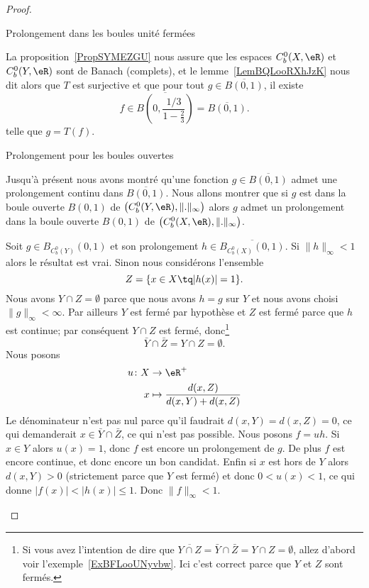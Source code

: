 \begin{proof}
\begin{subproof}
\item[Prolongement dans les boules unité fermées]

    La proposition~\ref{PropSYMEZGU} nous assure que les espaces \( C^0_b(X,\eR)\) et \( C_b^0(Y,\eR)\) sont de Banach (complets), et le lemme~\ref{LemBQLooRXhJzK} nous dit alors que \( T\) est surjective et que pour tout \( g\in\overline{ B(0,1) }\), il existe
    \begin{equation}
        f\in\overline{ B\left( 0,\frac{ 1/3 }{ 1-\frac{ 2 }{ 3 } } \right) }=\overline{ B(0,1) }.
    \end{equation}
    telle que \( g=T(f)\).


\item[Prolongement pour les boules ouvertes]

    Jusqu'à présent nous avons montré qu'une fonction \( g\in\overline{ B(0,1) }\) admet une prolongement continu dans \( \overline{ B(0,1) }\). Nous allons montrer que si \( g\) est dans la boule ouverte \( B(0,1)\) de \( \big( C^0_b(Y,\eR),\| . \|_{\infty} \big)\) alors \( g\) admet un prolongement dans la boule ouverte \( B(0,1)\) de \( \big( C_b^0(X,\eR),\| . \|_{\infty} \big)\).

    Soit \( g\in B_{C^0_b(Y)}(0,1) \) et son prolongement \( h\in \overline{ B_{C_b^0(X)}(0,1) }\). Si \( \| h \|_{\infty}<1\) alors le résultat est vrai. Sinon nous considérons l'ensemble
    \begin{equation}
        Z=\{ x\in X\tq | h(x) |=1 \}.
    \end{equation}
    Nous avons \( Y\cap Z=\emptyset\) parce que nous avons \( h=g\) sur \( Y\) et nous avons choisi \( \| g \|_{\infty}<\infty\). Par ailleurs \( Y\) est fermé par hypothèse et \( Z\) est fermé parce que \( h\) est continue; par conséquent \( Y\cap Z\) est fermé, donc\footnote{Si vous avez l'intention de dire que \( \overline{ Y\cap Z }=\bar Y\cap\bar Z=Y\cap Z=\emptyset\), allez d'abord voir l'exemple~\ref{ExBFLooUNyvbw}. Ici c'est correct parce que \( Y\) et \( Z\) sont fermés.}
    \begin{equation}
        \bar Y\cap\bar Z=Y\cap Z=\emptyset.
    \end{equation}
    Nous posons
    \begin{equation}
        \begin{aligned}
            u\colon X&\to \eR^+ \\
            x&\mapsto \frac{ d(x,Z) }{ d(x,Y)+d(x,Z) }
        \end{aligned}
    \end{equation}
    Le dénominateur n'est pas nul parce qu'il faudrait \( d(x,Y)=d(x,Z)=0\), ce qui demanderait \( x\in \bar Y\cap\bar Z\), ce qui n'est pas possible. Nous posons \( f=uh\). Si \( x\in Y\) alors \( u(x)=1\), donc \( f\) est encore un prolongement de \( g\). De plus \( f\) est encore continue, et donc encore un bon candidat. Enfin si \( x\) est hors de \( Y\) alors \( d(x,Y)>0\) (strictement parce que \( Y\) est fermé) et donc \( 0<u(x)<1\), ce qui donne \( | f(x) |<| h(x) |\leq 1\). Donc \( \| f \|_{\infty}<1\).


\end{subproof}
\end{proof}
